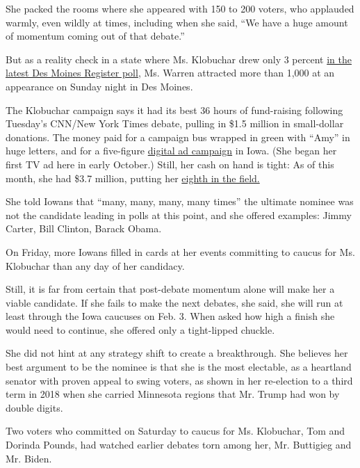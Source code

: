 She packed the rooms where she appeared with 150 to 200 voters, who
applauded warmly, even wildly at times, including when she said, ``We
have a huge amount of momentum coming out of that debate.''

But as a reality check in a state where Ms. Klobuchar drew only 3
percent
\href{https://www.desmoinesregister.com/story/news/politics/iowa-poll/2019/09/22/iowa-poll-election-2020-iowa-caucus-elizabeth-warren-joe-biden-bernie-sanders-democrat-candidates/2370015001/}{in
the latest Des Moines Register poll}, Ms. Warren attracted more than
1,000 at an appearance on Sunday night in Des Moines.

The Klobuchar campaign says it had its best 36 hours of fund-raising
following Tuesday's CNN/New York Times debate, pulling in \$1.5 million
in small-dollar donations. The money paid for a campaign bus wrapped in
green with ``Amy'' in huge letters, and for a five-figure
\href{https://www.youtube.com/watch?v=P2pEOIVWFm8\&feature=youtu.be}{digital
ad campaign} in Iowa. (She began her first TV ad here in early October.)
Still, her cash on hand is tight: As of this month, she had \$3.7
million, putting her
\href{https://www.nytimes.com/interactive/2019/10/16/us/elections/democratic-q3-fundraising.html}{eighth
in the field.}

She told Iowans that ``many, many, many, many times'' the ultimate
nominee was not the candidate leading in polls at this point, and she
offered examples: Jimmy Carter, Bill Clinton, Barack Obama.

On Friday, more Iowans filled in cards at her events committing to
caucus for Ms. Klobuchar than any day of her candidacy.

Still, it is far from certain that post-debate momentum alone will make
her a viable candidate. If she fails to make the next debates, she said,
she will run at least through the Iowa caucuses on Feb. 3. When asked
how high a finish she would need to continue, she offered only a
tight-lipped chuckle.

She did not hint at any strategy shift to create a breakthrough. She
believes her best argument to be the nominee is that she is the most
electable, as a heartland senator with proven appeal to swing voters, as
shown in her re-election to a third term in 2018 when she carried
Minnesota regions that Mr. Trump had won by double digits.

Two voters who committed on Saturday to caucus for Ms. Klobuchar, Tom
and Dorinda Pounds, had watched earlier debates torn among her, Mr.
Buttigieg and Mr. Biden.

